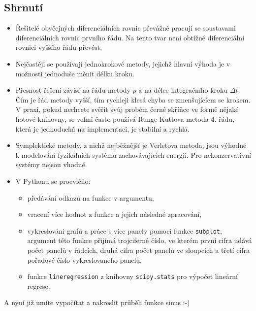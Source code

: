 \documentclass[a4paper,11pt,twoside]{article}
\def\code#1{\textnormal{\texttt{#1}}}
\begin{document}
    \subsection{Shrnutí}
    \begin{itemize}
    \item 
        Řešitelé obyčejných diferenciálních rovnic převážně pracují se soustavami diferenciálních rovnic prvního řádu.
        Na tento tvar není obtížné diferenciální rovnici vyššího řádu převést.

    \item
        Nejčastěji se používají jednokrokové metody, jejichž hlavní výhoda je v možnosti jednoduše měnit délku kroku.

    \item 
        Přesnost řešení závisí na řádu metody $p$ a na délce integračního kroku $\Delta t$.
        Čím je řád metody vyšší, tím rychleji klesá chyba se zmenšujícícm se krokem.
        V praxi, pokud nechcete svěřit svůj probém černé skříňce ve formě nějaké hotové knihovny, se velmi často používá Runge-Kuttova metoda 4. řádu, která je jednoduchá na implementaci, je stabilní a rychlá.

    \item
        Symplektické metody, z nichž nejběžnější je Verletova metoda, jsou výhodné k modelování fyzikálních systémů zachovávajících energii.
        Pro nekonzervativní systémy nejsou vhodné. 

    \item
        V Pythonu se procvičilo:
        \begin{itemize}
        \item
            předávání odkazů na funkce v argumentu,

        \item
            vracení více hodnot z funkce a jejich následné zpracování,

        \item
            vykreslování grafů a práce s více panely pomocí funkce \code{subplot}; argument této funkce přijímá trojciferné číslo, ve kterém první cifra udává počet panelů v řádcích, druhá cifra počet panelů ve sloupcích a třetí cifra pořadové číslo vykreslovaného panelu,

        \item
            funkce \code{lineregression} z knihovny \code{scipy.stats} pro výpočet lineární regrese.
        \end{itemize}

    \end{itemize}
    A nyní již umíte vypočítat a nakreslit průběh funkce sinus :-)
\end{document}
